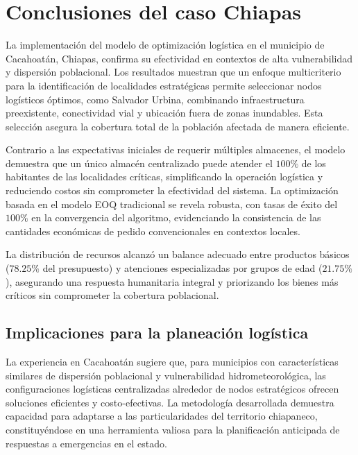 \documentclass[
  spanish,
  us-letterpaper,
  DIV=11,
  numbers=noendperiod]{scrreprt}
\numberwithin{equation}{section}
\begin{document}
\section{Conclusiones del caso
Chiapas}\label{conclusiones-del-caso-chiapas}

La implementación del modelo de optimización logística en el municipio
de Cacahoatán, Chiapas, confirma su efectividad en contextos de alta
vulnerabilidad y dispersión poblacional. Los resultados muestran que un
enfoque multicriterio para la identificación de localidades estratégicas
permite seleccionar nodos logísticos óptimos, como Salvador Urbina,
combinando infraestructura preexistente, conectividad vial y ubicación
fuera de zonas inundables. Esta selección asegura la cobertura total de
la población afectada de manera eficiente.

Contrario a las expectativas iniciales de requerir múltiples almacenes,
el modelo demuestra que un único almacén centralizado puede atender el
\(100\%\) de los habitantes de las localidades críticas, simplificando
la operación logística y reduciendo costos sin comprometer la
efectividad del sistema. La optimización basada en el modelo EOQ
tradicional se revela robusta, con tasas de éxito del \(100\%\) en la
convergencia del algoritmo, evidenciando la consistencia de las
cantidades económicas de pedido convencionales en contextos locales.

La distribución de recursos alcanzó un balance adecuado entre productos
básicos (\(78.25\%\) del presupuesto) y atenciones especializadas por
grupos de edad (\(21.75\%\)), asegurando una respuesta humanitaria
integral y priorizando los bienes más críticos sin comprometer la
cobertura poblacional.

\subsection{Implicaciones para la planeación
logística}\label{implicaciones-para-la-planeaciuxf3n-loguxedstica}

La experiencia en Cacahoatán sugiere que, para municipios con
características similares de dispersión poblacional y vulnerabilidad
hidrometeorológica, las configuraciones logísticas centralizadas
alrededor de nodos estratégicos ofrecen soluciones eficientes y
costo-efectivas. La metodología desarrollada demuestra capacidad para
adaptarse a las particularidades del territorio chiapaneco,
constituyéndose en una herramienta valiosa para la planificación
anticipada de respuestas a emergencias en el estado.
\end{document}
